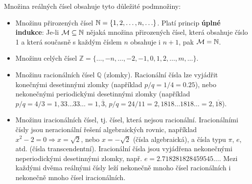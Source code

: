       Množina reálných čísel obsahuje tyto důležité podmnožiny:
      \begin{itemize}
        \item Množinu přirozených čísel \(\mathbb{N} = \{1, 2, \ldots, n, \ldots\}\). Platí 
              princip \textbf{úplné indukce}: Je-li \(\mathcal{M} \subseteq \mathbb{N}\) nějaká 
              množina přirozených čísel, která obsahuje číslo \num{1} a která současně s každým 
              číslem \(n\) obsahuje i \(n + 1\), pak \(\mathcal{M} = \mathbb{N}\).
        \item Množinu celých čísel \(\mathbb{Z} = \{\ldots, -n, \ldots, -2, -1, 0, 1, 2, \ldots, m, 
              \ldots\}\).
        \item Množinu racionálních čísel \(\mathbb{Q}\) (zlomky). Racionální čísla lze vyjádřit 
              konečnými desetinnými zlomky (například \(p/q = 1/4 = \num{0.25}\)), nebo nekonečnými 
              periodickými desetinnými zlomky (například \(p/q = 4/3 = 1,33\ldots33\ldots = 
              1,\overline{3}\), \(p/q = 24/11 = 2,1818\ldots1818\ldots = 2,\overline{18}\)).
        \item Množinu iracionálních čísel, tj. čísel, která nejsou racionální. Iracionálními čísly 
              jsou neracionální řešení algebraických rovnic, například \(x^2 - 2 = 0 \Rightarrow x 
              = \sqrt{2}\), nebo \(x = - \sqrt{2}\) (čísla algebraická), a čísla typu \(\pi\), 
              \(e\), atd. (čísla transcendentní). Iracionální čísla jsou vyjádřena       
              nekonečnými neperiodickými desetinnými zlomky, např. 
              \(e = \num{2.718281828459545}\ldots\). Mezi každými dvěma reálnými čísly leží 
              nekonečně mnoho čísel racionálních i nekonečně mnoho čísel iracionálních.
      \end{itemize}
      
